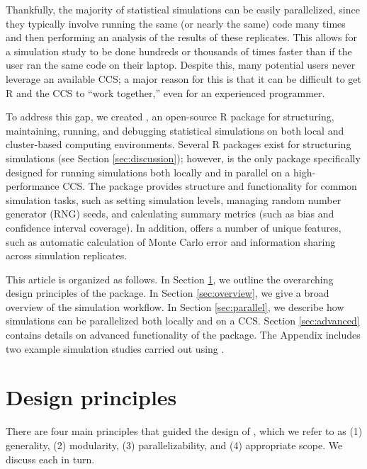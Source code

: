 Thankfully, the majority of statistical simulations can be easily parallelized, since they typically involve running the same (or nearly the same) code many times and then performing an analysis of the results of these replicates. This allows for a simulation study to be done hundreds or thousands of times faster than if the user ran the same code on their laptop. Despite this, many potential users never leverage an available CCS; a major reason for this is that it can be difficult to get R and the CCS to ``work together,'' even for an experienced programmer.

To address this gap, we created , an open-source R package \citep{Rsoftware} for structuring, maintaining, running, and debugging statistical simulations on both local and cluster-based computing environments. Several R packages exist for structuring simulations (see Section \ref{sec:discussion}); however,  is the only package specifically designed for running simulations both locally and in parallel on a high-performance CCS. The package provides structure and functionality for common simulation tasks, such as setting simulation levels, managing random number generator (RNG) seeds, and calculating summary metrics (such as bias and confidence interval coverage). In addition,  offers a number of unique features, such as automatic calculation of Monte Carlo error \citep{koehler2009assessment} and information sharing across simulation replicates.

This article is organized as follows. In Section \ref{sec:design}, we outline the overarching design principles of the package. In Section \ref{sec:overview}, we give a broad overview of the  simulation workflow. In Section \ref{sec:parallel}, we describe how simulations can be parallelized both locally and on a CCS. Section \ref{sec:advanced} contains details on advanced functionality of the package. The Appendix includes two example simulation studies carried out using .

\section{Design principles} \label{sec:design}

There are four main principles that guided the design of , which we refer to as (1) generality, (2) modularity, (3) parallelizability, and (4) appropriate scope. We discuss each in turn.

